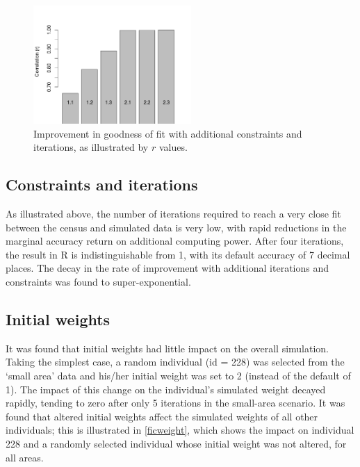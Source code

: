 \documentclass[a4paper,10pt]{article}
\begin{document}
\begin{figure}[h]
 \begin{center}
  \includegraphics[width=6cm]{corr-baseline}
 \end{center}
\caption{Improvement in goodness of fit with additional constraints and iterations, 
as illustrated by $r$ values.}
\label{fnconscor}
\end{figure}

\subsection{Constraints and iterations}
As illustrated above, the number of iterations 
required to reach a very close fit between the census
 and simulated data is very low, with rapid reductions in
 the marginal accuracy return on additional computing power.
 After four iterations, the result in R is indistinguishable from 1,
 with its default accuracy of 7 decimal places. 
The decay in the rate of improvement with additional 
iterations and constraints was found to super-exponential. 

\subsection{Initial weights}
It was found that initial weights had little impact on the overall simulation. 
Taking the simplest case, a random individual (id = 228) was selected from the 
`small area' data and his/her initial weight was set to 2 
(instead of the default of 1). The impact of this change on the individual's 
simulated weight decayed rapidly, tending to zero after only 5 iterations in the small-area scenario. 
It was found that altered initial weights affect the simulated weights of all other individuals; 
this is illustrated in \cref{ficweight}, which shows the impact on individual 228 and a randomly selected 
individual whose initial weight was not altered, for all areas.
\end{document}
